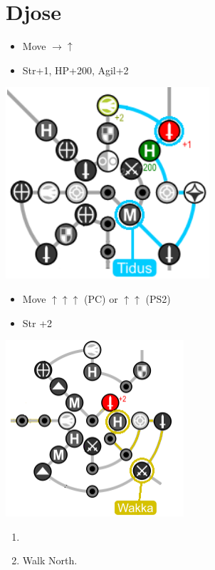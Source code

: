 \chapter{Djose}

\begin{spheregrid}
  \begin{itemize}
    \tidusf
    \begin{itemize}
      \item Move $\rightarrow\uparrow$
      \item Str+1, HP+200, Agil+2
    \end{itemize}
    \includegraphics{graphics/djosetidus}
    \wakkaf
    \begin{itemize}
      \item Move $\uparrow\uparrow\uparrow$ (PC) or $\uparrow\uparrow$ (PS2)
      \item Str +2
    \end{itemize}
    \includegraphics{graphics/djosewakka}
  \end{itemize}
\end{spheregrid}
\begin{enumerate}
  \item \formation{\tidus}{\yuna}{\auron}
  \item Walk North.
\end{enumerate}
